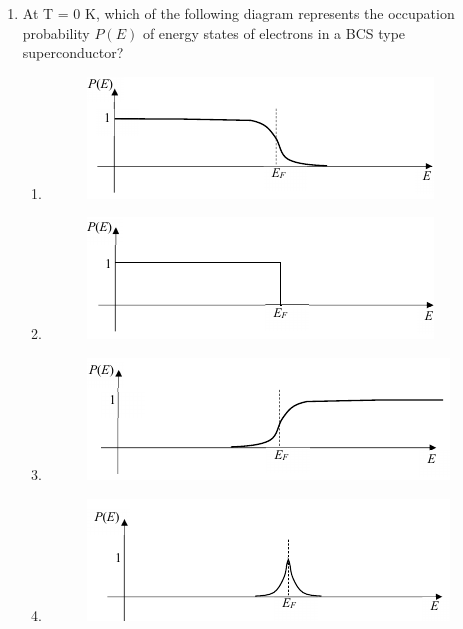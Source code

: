 \documentclass[journal,12pt,onecolumn]{IEEEtran}
\theoremstyle{remark}
\begin{document}
\begin{enumerate}
\item
At T = 0 K, which of the following diagram represents the occupation probability $P(E)$ of energy states of electrons in a BCS type superconductor?
\begin{enumerate}
    \item \begin{figure}[H] \caption*{} \label{fig:44a}\includegraphics{figs/44a.png}\end{figure}%
    \item \begin{figure}[H] \caption*{} \label{fig:44b}\includegraphics{figs/44b.png}\end{figure}%
    \item \begin{figure}[H] \caption*{} \label{fig:44c}\includegraphics{figs/44c.png}\end{figure}%
    \item \begin{figure}[H] \caption*{} \label{fig:44d}\includegraphics{figs/44d.png}\end{figure}%
\end{enumerate}



\end{enumerate}
\end{document}
